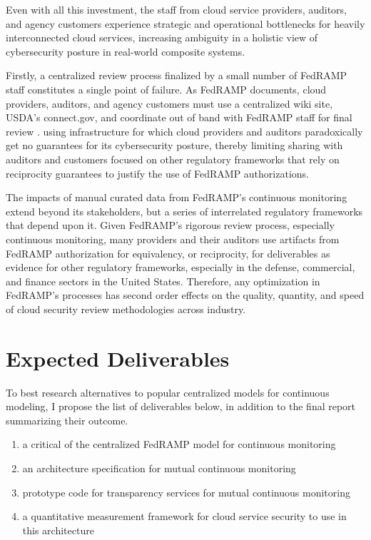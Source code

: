 \documentclass{jdf}
\begin{document}
Even with all this investment, the staff from cloud service providers, auditors, and agency customers experience strategic and operational bottlenecks for heavily interconnected cloud services, increasing ambiguity in a holistic view of cybersecurity posture in real-world composite systems. 

Firstly, a centralized review process finalized by a small number of FedRAMP staff constitutes a single point of failure. As FedRAMP documents, cloud providers, auditors, and agency customers must use a centralized wiki site, USDA's connect.gov, and coordinate out of band with FedRAMP staff for final review \citeyear[pp.~3,14]{fedramp_auth_playbook25}. using infrastructure for which cloud providers and auditors paradoxically get no guarantees for its cybersecurity posture, thereby limiting sharing with auditors and customers focused on other regulatory frameworks that rely on reciprocity guarantees to justify the use of FedRAMP authorizations.

The impacts of manual curated data from FedRAMP's continuous monitoring extend beyond its stakeholders, but a series of interrelated regulatory frameworks that depend upon it. Given FedRAMP's rigorous review process, especially continuous monitoring, many providers and their auditors use artifacts from FedRAMP authorization for equivalency, or reciprocity, for deliverables as evidence for other regulatory frameworks, especially in the defense, commercial, and finance sectors in the United States. Therefore, any optimization in FedRAMP's processes has second order effects on the quality, quantity, and speed of cloud security review methodologies across industry.

\section{Expected Deliverables}

To best research alternatives to popular centralized models for continuous modeling, I propose the list of deliverables below, in addition to the final report summarizing their outcome. 

\begin{enumerate}
    \item a critical of the centralized FedRAMP model for continuous monitoring
    \item an architecture specification for mutual continuous monitoring
    \item prototype code for transparency services for mutual continuous monitoring
    \item a quantitative measurement framework for cloud service security to use in this architecture
\end{enumerate}



\end{document}
